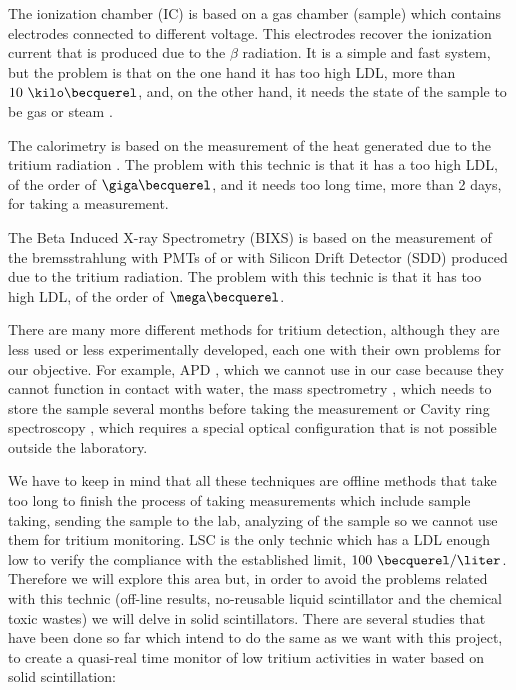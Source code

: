 The ionization chamber (IC) is based on a gas chamber (sample) which contains electrodes connected to different voltage. This electrodes recover the ionization current that is produced due to the $\beta$ radiation. It is a simple and fast system, but the problem is that on the one hand it has too high LDL, more than $ 10~\kilo\becquerel$, and, on the other hand, it needs the state of the sample to be gas or steam \cite{IonizationChamber1, IonizationChamber2}.

The calorimetry is based on the measurement of the heat generated due to the tritium radiation \cite{Calorimeter1, Calorimeter2}. The problem with this technic is that it has a too high LDL, of the order of $\giga\becquerel$, and it needs too long time, more than 2 days, for taking a measurement.

The Beta Induced X-ray Spectrometry (BIXS) is based on the measurement of the bremsstrahlung with PMTs of  \cite{XRays1, XRays2} or with Silicon Drift Detector (SDD) \cite{Bremstrahlung} produced due to the tritium radiation. The problem with this technic is that it has too high LDL, of the order of $\mega\becquerel$.

There are many more different methods for tritium detection, although they are less used or less experimentally developed, each one with their own problems for our objective. For example,  APD \cite{APD}, which we cannot use in our case because they cannot function in contact with water, the mass spectrometry \cite{Spectrometry}, which needs to store the sample several months before taking the measurement or Cavity ring spectroscopy \cite{Ring}, which requires a special optical configuration that is not possible outside the laboratory.

We have to keep in mind that all these techniques are offline methods that take too long to finish the process of taking measurements which include sample taking, sending the sample to the lab, analyzing of the sample so we cannot use them for tritium monitoring. LSC is the only technic which has a LDL enough low to verify the compliance with the established limit, $100~\becquerel/\liter$. Therefore we will explore this area but, in order to avoid the problems related with this technic (off-line results, no-reusable liquid scintillator and the chemical toxic wastes) we will delve in solid scintillators. There are several studies that have been done so far which intend to do the same as we want with this project, to create a quasi-real time monitor of low tritium activities in water based on solid scintillation:

